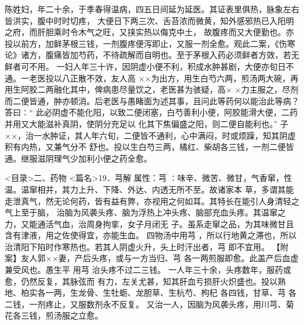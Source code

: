 \documentclass[a4paper,12pt,UTF8,twoside]{ctexbook}
\begin{document}
陈姓妇，年二十余，于季春得温病，四五日间延为延医。其证表里俱热，脉象左右皆洪实，腹中时时切疼， 
大便日下两三次、舌苔浓而微黄，知外感邪热已入阳明之府，而肝胆乘时令木气之旺，又挟实热以侮克中土， 
故腹疼而又大便勤也。亦投以前方，加鲜茅根三钱，一剂腹疼便泻即止，又服一剂全愈。观此二案，《伤寒 
论》诸方，腹痛皆加芍药，不待疏解而自明也。至于茅根入药必须鲜者方效，若无鲜者可不用。 
一妇人年三十许，因阴虚小便不利，积成水肿甚剧，大便亦旬日不通。一老医投以八正散不效，友人高 
××为出方，用生白芍六两，煎汤两大碗，再用生阿胶二两融化其中，俾病患尽量饮之，老医甚为骇疑，高× 
×力主服之，尽剂而二便皆通，肿亦顿消。后老医与愚睹面为述其事，且问此等药何以能治此等病？答曰∶“ 
此必阴虚不能化阳，以致二便闭塞，白芍善利小便，阿胶能滑大便，二药并用又大能滋补真阴，使阴分充足以 
化其下焦偏盛之阳，则二便自能利也。” 
子××，治一水肿证，其人年六旬，二便皆不通利，心中满闷，时或烦躁，知其阴虚积有内热，又兼气分不 
舒也。投以生白芍三两，橘红、柴胡各三钱，一剂二便皆通。继服滋阴理气少加利小便之药全愈。 

<目录>二、药物
<篇名>19．芎解
属性：芎 ∶味辛、微苦、微甘，气香窜，性温。温窜相并，其力上升、下降、外达、内透无所不至。故诸家本 
草，多谓其能走泄真气，然无论何药，皆有益有弊，亦视用之何如耳。其特长在能引人身清轻之气上至于脑， 
治脑为风袭头疼、脑为浮热上冲头疼、脑部充血头疼。其温窜之力，又能通活气血，治周身拘挛，女子月闭无 
子。虽系走窜之品，为其味微甘且含有津液，用之佐使得宜，亦能生血。 
四物汤中用芎 ，所以行地黄之滞也，所以治清阳下陷时作寒热也。若其人阴虚火升，头上时汗出者，芎 
即不宜用。 
【附案】友人郭××妻，产后头疼，或与一方当归、芎 各一两煎服即愈。此盖产后血虚兼受风也。愚生平 
用芎 治头疼不过二三钱。 
一人年三十余，头疼数年，服药或愈，仍然反复，其脉弦而 
有力，左关尤甚，知其肝血亏损肝火炽盛也。投以熟地、柏实各一两，生龙骨、生牡蛎、龙胆草、生杭芍、枸杞 
各四钱，甘草、芎 各二钱，一剂疼止，又服数剂永不反复。 
又治一人，因脑为风袭头疼，用川芎、菊花各三钱，煎汤服之立愈。 
\end{document}
